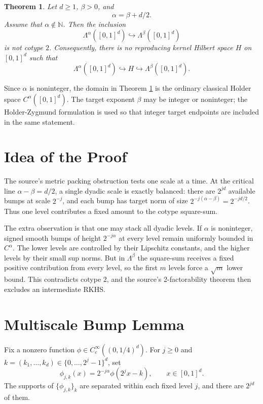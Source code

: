 \documentclass[11pt]{article}
\newtheorem{theorem}{Theorem}
\newcommand{\N}{\mathbb{N}}
\newcommand{\Lam}{\Lambda}
\begin{document}
\begin{theorem}\label{thm:noninteger-critical}
Let \(d\ge1\), \(\beta>0\), and
\[
  \alpha=\beta+d/2.
\]
Assume that \(\alpha\notin \N\). Then the inclusion
\[
  \Lam^\alpha([0,1]^d)\hookrightarrow \Lam^\beta([0,1]^d)
\]
is not cotype \(2\). Consequently, there is no reproducing kernel Hilbert
space \(H\) on \([0,1]^d\) such that
\[
  \Lam^\alpha([0,1]^d)\hookrightarrow H
  \hookrightarrow \Lam^\beta([0,1]^d).
\]
\end{theorem}

Since \(\alpha\) is noninteger, the domain in Theorem
\ref{thm:noninteger-critical} is the ordinary classical Holder space
\(C^\alpha([0,1]^d)\). The target exponent \(\beta\) may be integer or
noninteger; the Holder-Zygmund formulation is used so that integer target
endpoints are included in the same statement.

\section*{Idea of the Proof}

The source's metric packing obstruction tests one scale at a time. At the
critical line \(\alpha-\beta=d/2\), a single dyadic scale is exactly balanced:
there are \(2^{jd}\) available bumps at scale \(2^{-j}\), and each bump has
target norm of size \(2^{-j(\alpha-\beta)}=2^{-jd/2}\). Thus one level
contributes a fixed amount to the cotype square-sum.

The extra observation is that one may stack all dyadic levels. If
\(\alpha\) is noninteger, signed smooth bumps of height \(2^{-j\alpha}\)
at every level remain uniformly bounded in \(C^\alpha\). The lower levels
are controlled by their Lipschitz constants, and the higher levels by their
small sup norms. But in \(\Lam^\beta\) the square-sum receives a fixed
positive contribution from every level, so the first \(m\) levels force a
\(\sqrt m\) lower bound. This contradicts cotype \(2\), and the source's
2-factorability theorem then excludes an intermediate RKHS.

\section*{Multiscale Bump Lemma}

Fix a nonzero function \(\phi\in C_c^\infty((0,1/4)^d)\). For
\(j\ge0\) and \(k=(k_1,\ldots,k_d)\in\{0,\ldots,2^j-1\}^d\), set
\[
  \phi_{j,k}(x)=2^{-j\alpha}\phi(2^j x-k),
  \qquad x\in[0,1]^d.
\]
The supports of \(\{\phi_{j,k}\}_k\) are separated within each fixed level
\(j\), and there are \(2^{jd}\) of them.
\end{document}
